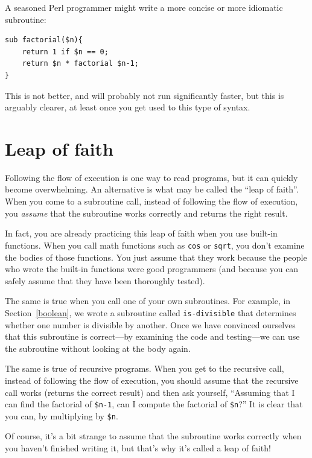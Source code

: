 A seasoned Perl programmer might write a more concise or
more idiomatic subroutine:

\begin{verbatim}
sub factorial($n){
    return 1 if $n == 0;
    return $n * factorial $n-1;
}
\end{verbatim}
%
This is not better, and will probably not run significantly 
faster, but this is arguably clearer, at least once you get 
used to this type of syntax.

\section{Leap of faith}

Following the flow of execution is one way to read programs, but
it can quickly become overwhelming.  An alternative is what may 
be called the ``leap of faith''.  When you come to a
subroutine call, instead of following the flow of execution, you {\em
assume} that the subroutine works correctly and returns the right
result.

In fact, you are already practicing this leap of faith when you use
built-in functions.  When you call math functions such as {\tt cos} or {\tt sqrt},
you don't examine the bodies of those functions.  You just
assume that they work because the people who wrote the built-in
functions were good programmers (and because you can safely 
assume that they have been thoroughly tested).

The same is true when you call one of your own subroutines.  For
example, in Section~\ref{boolean}, we wrote a subroutine called 
\verb"is-divisible" that determines whether one number is divisible by
another.  Once we have convinced ourselves that this subroutine is
correct---by examining the code and testing---we can use the subroutine without looking at the body again.

The same is true of recursive programs.  When you get to the recursive
call, instead of following the flow of execution, you should assume
that the recursive call works (returns the correct result) and then ask
yourself, ``Assuming that I can find the factorial of \verb"$n-1", can I
compute the factorial of \verb"$n"?''  It is clear that you
can, by multiplying by \verb"$n".

Of course, it's a bit strange to assume that the subroutine works
correctly when you haven't finished writing it, but that's why
it's called a leap of faith!


